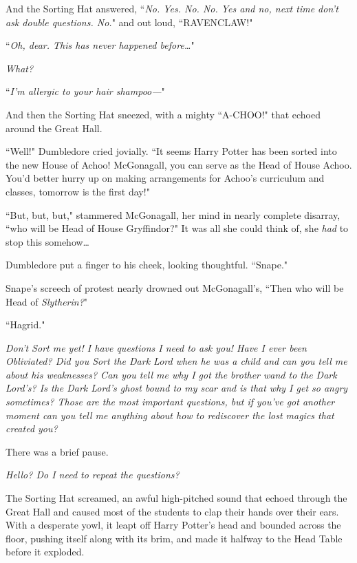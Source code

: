 And the Sorting Hat answered, ``\emph{No. Yes. No. No. Yes and no, next time don't ask double questions. No.}" and out loud, ``RAVENCLAW!"

\later

``\emph{Oh, dear. This has never happened before{\ldots}}"

\emph{What?}

``\emph{I'm allergic to your hair shampoo—}"

And then the Sorting Hat sneezed, with a mighty ``A-CHOO!" that echoed around the Great Hall.

``Well!" Dumbledore cried jovially. ``It seems Harry Potter has been sorted into the new House of Achoo! McGonagall, you can serve as the Head of House Achoo. You'd better hurry up on making arrangements for Achoo's curriculum and classes, tomorrow is the first day!"

``But, but, but," stammered McGonagall, her mind in nearly complete disarray, ``who will be Head of House Gryffindor?" It was all she could think of, she \emph{had} to stop this somehow{\ldots}

Dumbledore put a finger to his cheek, looking thoughtful. ``Snape."

Snape's screech of protest nearly drowned out McGonagall's, ``Then who will be Head of \emph{Slytherin?}"

``Hagrid."

\later

\emph{Don't Sort me yet! I have questions I need to ask you! Have I ever been Obliviated? Did you Sort the Dark Lord when he was a child and can you tell me about his weaknesses? Can you tell me why I got the brother wand to the Dark Lord's? Is the Dark Lord's ghost bound to my scar and is that why I get so angry sometimes? Those are the most important questions, but if you've got another moment can you tell me anything about how to rediscover the lost magics that created you?}

There was a brief pause.

\emph{Hello? Do I need to repeat the questions?}

The Sorting Hat screamed, an awful high-pitched sound that echoed through the Great Hall and caused most of the students to clap their hands over their ears. With a desperate yowl, it leapt off Harry Potter's head and bounded across the floor, pushing itself along with its brim, and made it halfway to the Head Table before it exploded.

\later

